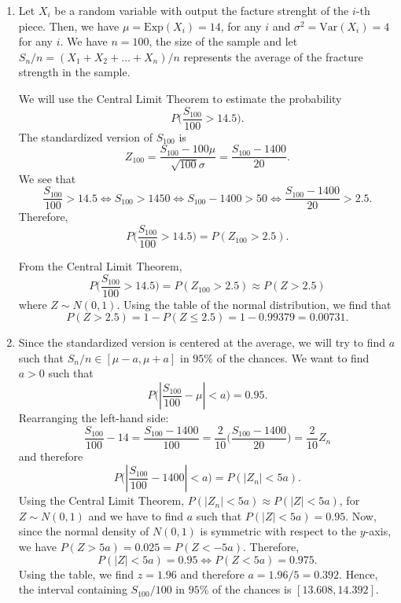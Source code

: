 \begin{problem}

    \begin{enumerate}[label=\alph*)]
    \item Let $X_i$ be a random variable with output the facture strenght of the $i$-th piece. Then, we have $\mu = \mathrm{Exp} (X_i) = 14$, for any $i$ and $\sigma^2 = \mathrm{Var} (X_i) = 4$ for any $i$. We have $n = 100$, the size of the sample and let $S_n/n = (X_1 + X_2 + \ldots + X_n)/n$ represents the average of the fracture strength in the sample.

    We will use the Central Limit Theorem to estimate the probability
        \[
            P \Big( \frac{S_{100}}{100} > 14.5 \Big) .
        \]
    The standardized version of $S_{100}$ is 
        \[
            Z_{100} = \frac{S_{100} - 100 \mu}{\sqrt{100} \sigma} = \frac{S_{100} - 1400}{20} .
        \]
    We see that
        \[
            \frac{S_{100}}{100} > 14.5 \iff S_{100} > 1450 \iff S_{100} - 1400 > 50 \iff \frac{S_{100} - 1400}{20} > 2.5 .
        \]
    Therefore, 
        \[
            P \Big( \frac{S_{100}}{100} > 14.5 \Big) = P (Z_{100} > 2.5 ) .
        \]
    
    From the Central Limit Theorem,
        \[
            P \Big( \frac{S_{100}}{100} > 14.5 \Big) = P (Z_{100} > 2.5 ) \approx P (Z > 2.5 )
        \]
    where $Z \sim N (0, 1 )$. Using the table of the normal distribution, we find that
        \[
            P (Z > 2.5) = 1 - P (Z \leq 2.5 ) = 1 - 0.99379 = 0.00731 .
        \]
    \item Since the standardized version is centered at the average, we will try to find $a$ such that $S_n/n \in [\mu - a , \mu + a ]$ in $95\%$ of the chances. We want to find $a > 0$ such that
        \[
            P \Big( \left| \frac{S_{100}}{100} - \mu \right| < a \Big) = 0.95 .
        \]
    Rearranging the left-hand side:
        \[
            \frac{S_{100}}{100} - 14 = \frac{S_{100} - 1400}{100} = \frac{2}{10} \Big( \frac{S_{100} - 1400}{20} \Big) = \frac{2}{10} Z_n
        \]
    and therefore
        \[
            P \Big( \left| \frac{S_{100}}{100} - 1400 \right| < a \Big) = P (|Z_n| < 5a ) .
        \]
    Using the Central Limit Theorem, $P (|Z_n| < 5a ) \approx P (|Z| < 5a )$, for $Z \sim N (0, 1)$ and we have to find $a$ such that $P (|Z| < 5a ) = 0.95$. Now, since the normal density of $N (0, 1)$ is symmetric with respect to the $y$-axis, we have $P (Z > 5a ) = 0.025 = P (Z < -5a )$. Therefore, 
        \[
            P (|Z| < 5a ) = 0.95 \iff P (Z < 5a ) = 0.975 .
        \]
    Using the table, we find $z = 1.96$ and therefore $a = 1.96/5 = 0.392$. Hence, the interval containing $S_{100}/100$ in $95\%$ of the chances is $[13.608, 14.392]$. 
    \end{enumerate}
\end{problem}

